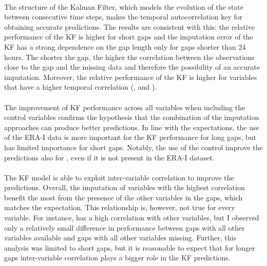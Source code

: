 \documentclass{article}
\begin{document}
\paragraph{} The structure of the Kalman Filter, which models the evolution of the state between consecutive time steps, makes the temporal autocorrelation key for obtaining accurate predictions. The results are consistent with this: the relative performance of the KF is higher for short gaps and the imputation error of the KF has a strong dependence on the gap length only for gaps shorter than 24 hours.  The shorter the gap, the higher the correlation between the observations close to the gap and the missing data and therefore the possibility of an accurate imputation. Moreover, the relative performance of the KF is higher for variables that have a higher temporal correlation (,  and ).




\paragraph{} The improvement of KF performance across all variables when including the control variables confirms the hypothesis that the combination of the imputation approaches can produce better predictions. In line with the expectations, the use of the ERA-I data is more important for the KF performance for long gaps, but has limited importance for short gaps. Notably, the use of the control improve the predictions also for , even if it is not present in the ERA-I dataset.


\paragraph{} The KF model is able to exploit inter-variable correlation to improve the predictions. Overall, the imputation of variables with the highest correlation benefit the most from the presence of the other variables in the gaps, which matches the expectation. This relationship is, however, not true for every variable. For instance,  has a high correlation with other variables, but I observed only a relatively small difference in performance between gaps with all other variables available and gaps with all other variables missing.
Further, this analysis was limited to short gaps, but it is reasonable to expect that for longer gaps inter-variable correlation plays a bigger role in the KF predictions.
\end{document}
